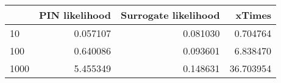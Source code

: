 \begin{tabular}{lrrr}
\toprule
{} &  PIN likelihood &  Surrogate likelihood &     xTimes \\
\midrule
10   &        0.057107 &              0.081030 &   0.704764 \\
100  &        0.640086 &              0.093601 &   6.838470 \\
1000 &        5.455349 &              0.148631 &  36.703954 \\
\bottomrule
\end{tabular}
